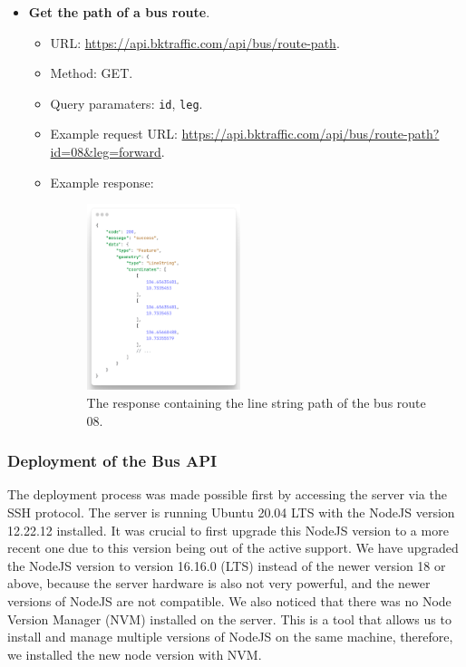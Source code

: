 \begin{itemize}
    \item \textbf{Get the path of a bus route}.
    \begin{itemize}
        \item URL: \url{https://api.bktraffic.com/api/bus/route-path}.
        \item Method: GET.
        \item Query paramaters: \lstinline{id}, \lstinline{leg}.
        \item Example request URL: \url{https://api.bktraffic.com/api/bus/route-path?id=08&leg=forward}.
        \item Example response:
        \begin{figure}[H]
            \centering
            \includegraphics[width=0.45\textwidth]{assets/images/Implementation/route_path_response.png}
            \caption{The response containing the line string path of the bus route 08.}
            \label{fig:route_path_response}
        \end{figure}
    \end{itemize} 
\end{itemize}

\subsubsection{Deployment of the Bus API}
The deployment process was made possible first by accessing the server via the SSH protocol. The server is running Ubuntu 20.04 LTS with the NodeJS version 12.22.12 installed. It was crucial to first upgrade this NodeJS version to a more recent one due to this version being out of the active support. We have upgraded the NodeJS version to version 16.16.0 (LTS) instead of the newer version 18 or above, because the server hardware is also not very powerful, and the newer versions of NodeJS are not compatible. We also noticed that there was no Node Version Manager (NVM) installed on the server. This is a tool that allows us to install and manage multiple versions of NodeJS on the same machine, therefore, we installed the new node version with NVM.

